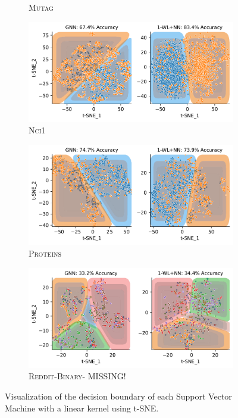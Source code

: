 \begin{figure}[H]
\begin{subfigure}[b]{0.49\textwidth}
		\vspace*{-4ex} 
		\caption{\textsc{Mutag}}
	\end{subfigure}
	\hfill
	\begin{subfigure}[b]{0.49\textwidth}
		\centering
		\includegraphics[width=\textwidth]{Figures/tsne_svm_lin_NCI1.pdf}
		\vspace*{-4ex} 
		\caption{\textsc{Nci1}}
	\end{subfigure}
	\par\bigskip
	\begin{subfigure}[b]{0.49\textwidth}
		\centering
		\includegraphics[width=\textwidth]{Figures/tsne_svm_lin_PROTEINS.pdf}
		\vspace*{-4ex} 
		\caption{\textsc{Proteins}}
	\end{subfigure}
	\hfill
	\begin{subfigure}[b]{0.49\textwidth}
		\centering
		\includegraphics[width=\textwidth]{Figures/tsne_svm_lin_ENZYMES.pdf}
		\vspace*{-4ex} 
		\caption{\textsc{Reddit-Binary}- MISSING!}
	\end{subfigure}
	\caption{Visualization of the decision boundary of each Support Vector Machine with a linear kernel using t-SNE.}
\end{figure}

